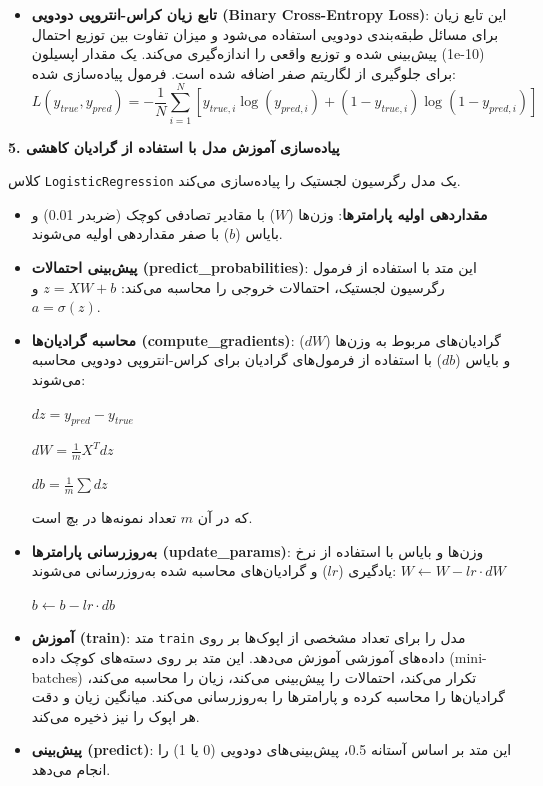 \begin{enumerate}
\begin{itemize}
		\item \textbf{تابع زیان کراس-انتروپی دودویی (Binary Cross-Entropy Loss)}: این تابع زیان برای مسائل طبقه‌بندی دودویی استفاده می‌شود و میزان تفاوت بین توزیع احتمال پیش‌بینی شده و توزیع واقعی را اندازه‌گیری می‌کند. یک مقدار اپسیلون (1e-10) برای جلوگیری از لگاریتم صفر اضافه شده است. فرمول پیاده‌سازی شده:
		$$L(y_{true}, y_{pred}) = -\frac{1}{N} \sum_{i=1}^{N} [y_{true,i} \log(y_{pred,i}) + (1 - y_{true,i}) \log(1 - y_{pred,i})]$$
		
	\end{itemize}
	
	\textbf{5. پیاده‌سازی آموزش مدل با استفاده از گرادیان کاهشی}
	
	کلاس \texttt{LogisticRegression} یک مدل رگرسیون لجستیک را پیاده‌سازی می‌کند.
	
	\begin{itemize}
		\item \textbf{مقداردهی اولیه پارامترها}: وزن‌ها ($W$) با مقادیر تصادفی کوچک (ضربدر 0.01) و بایاس ($b$) با صفر مقداردهی اولیه می‌شوند.
		\item \textbf{پیش‌بینی احتمالات (predict\_probabilities)}: این متد با استفاده از فرمول رگرسیون لجستیک، احتمالات خروجی را محاسبه می‌کند: $z = XW + b$ و $a = \sigma(z)$.
		\item \textbf{محاسبه گرادیان‌ها (compute\_gradients)}: گرادیان‌های مربوط به وزن‌ها ($dW$) و بایاس ($db$) با استفاده از فرمول‌های گرادیان برای کراس-انتروپی دودویی محاسبه می‌شوند:
		
		
		$dz = y_{pred} - y_{true}$
		
		
		$dW = \frac{1}{m} X^T dz$
		
		
		$db = \frac{1}{m} \sum dz$
		
		که در آن $m$ تعداد نمونه‌ها در بچ است.
		\item \textbf{به‌روزرسانی پارامترها (update\_params)}: وزن‌ها و بایاس با استفاده از نرخ یادگیری ($lr$) و گرادیان‌های محاسبه شده به‌روزرسانی می‌شوند:
		$W \leftarrow W - lr \cdot dW$
		
		
		$b \leftarrow b - lr \cdot db$
		
		\item \textbf{آموزش (train)}: متد \texttt{train} مدل را برای تعداد مشخصی از اپوک‌ها بر روی داده‌های آموزشی آموزش می‌دهد. این متد بر روی دسته‌های کوچک داده (mini-batches) تکرار می‌کند، احتمالات را پیش‌بینی می‌کند، زیان را محاسبه می‌کند، گرادیان‌ها را محاسبه کرده و پارامترها را به‌روزرسانی می‌کند. میانگین زیان و دقت هر اپوک را نیز ذخیره می‌کند.
		\item \textbf{پیش‌بینی (predict)}: این متد بر اساس آستانه 0.5، پیش‌بینی‌های دودویی (0 یا 1) را انجام می‌دهد.
	\end{itemize}
	

\end{enumerate}

